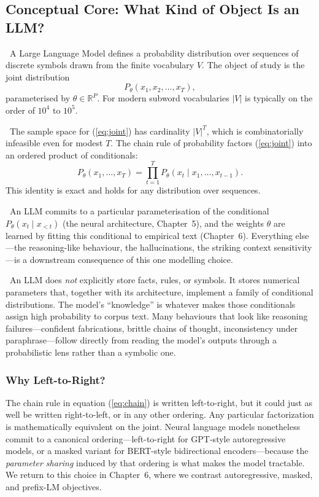 \subsection{Conceptual Core: What Kind of Object Is an LLM?}

\Def\ A Large Language Model defines a probability distribution over
sequences of discrete symbols drawn from the finite vocabulary $V$.
The object of study is the joint distribution
\begin{equation}
P_\theta(x_1, x_2, \ldots, x_T),
\label{eq:joint}
\end{equation}
parameterised by $\theta \in \mathbb{R}^P$. For modern subword
vocabularies $|V|$ is typically on the order of $10^4$ to $10^5$.

\Ident\ The sample space for (\ref{eq:joint}) has cardinality $|V|^T$,
which is combinatorially infeasible even for modest $T$. The chain rule
of probability factors (\ref{eq:joint}) into an ordered product of
conditionals:
\begin{equation}
P_\theta(x_1, \ldots, x_T) = \prod_{t=1}^{T} P_\theta(x_t \mid x_1, \ldots, x_{t-1}).
\label{eq:chain}
\end{equation}
This identity is exact and holds for any distribution over sequences.

\Cons\ An LLM commits to a particular parameterisation of the
conditional $P_\theta(x_t \mid x_{<t})$ (the neural architecture,
Chapter~5), and the weights $\theta$ are learned by fitting this
conditional to empirical text (Chapter~6). Everything else---the
reasoning-like behaviour, the hallucinations, the striking context
sensitivity---is a downstream consequence of this one modelling choice.

\Emp\ An LLM does \emph{not} explicitly store facts, rules, or
symbols. It stores numerical parameters that, together with its
architecture, implement a family of conditional distributions. The
model's ``knowledge'' is whatever makes those conditionals assign high
probability to corpus text. Many behaviours that look like reasoning
failures---confident fabrications, brittle chains of thought,
inconsistency under paraphrase---follow directly from reading the
model's outputs through a probabilistic lens rather than a symbolic
one.

\subsubsection{Why Left-to-Right?}

The chain rule in equation (\ref{eq:chain}) is written left-to-right, but it could just as well be written right-to-left, or in any other ordering. Any particular factorization is mathematically equivalent on the joint. Neural language models nonetheless commit to a canonical ordering---left-to-right for GPT-style autoregressive models, or a masked variant for BERT-style bidirectional encoders---because the \emph{parameter sharing} induced by that ordering is what makes the model tractable. We return to this choice in Chapter~6, where we contrast autoregressive, masked, and prefix-LM objectives.

